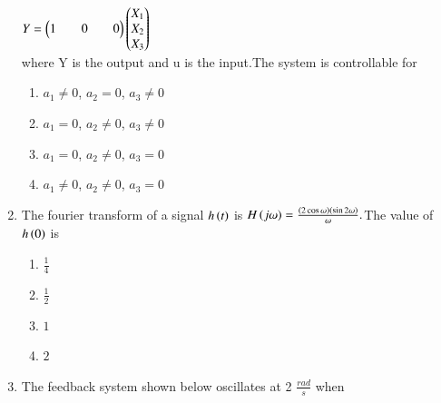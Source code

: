 \documentclass[journal]{IEEEtran}
\begin{document}
\begin{enumerate}
                    $Y=\begin{pmatrix}1 && 0 && 0\end{pmatrix}\begin{pmatrix}X_{1}\\X_{2}\\X_{3}\end{pmatrix}$\\
        where Y is the output and u is the input.The system is controllable for 
        \begin{enumerate}
            \item$a_{1}\neq0$, $a_{2}=0$, $a_{3}\neq0$\\
            \item$a_{1}=0$, $a_{2}\neq0$, $a_{3}\neq0$\\
            \item$a_{1}=0$, $a_{2}\neq0$, $a_{3}=0$\\
            \item$a_{1}\neq0$, $a_{2}\neq0$, $a_{3}=0$ 
        \end{enumerate}
      \item The fourier transform of a signal $h\left(t\right)$ is $H\left(j\omega\right)=\frac{\left(2\cos{\omega}\right)\left(\sin {2\omega}\right)}{\omega}.$The value of $h\left(0\right)$ is 
       \begin{enumerate}
           \item$\frac{1}{4}$
           \item$\frac{1}{2}$
           \item$1$\\
          \item$2$
       \end{enumerate}
       \item The feedback system shown below oscillates at 2 $\frac{rad}{s}$ when\\
    


\end{enumerate}
\end{document}
